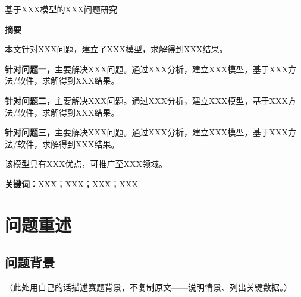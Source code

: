 \documentclass[12pt,a4paper]{article}
\title{}
\author{}\date{}
\numberwithin{equation}{section}
\numberwithin{figure}{section}
\numberwithin{table}{section}
\begin{document}
\thispagestyle{empty}


\vspace{0.5cm}

\begin{center}
\heiti{}
基于XXX模型的XXX问题研究
\end{center}


\begin{center}
\heiti{}\textbf{摘要}
\end{center}

\vspace{0.2cm}

本文针对XXX问题，建立了XXX模型，求解得到XXX结果。

\textbf{针对问题一，}主要解决XXX问题。通过XXX分析，建立XXX模型，基于XXX方法/软件，求解得到XXX结果。

\textbf{针对问题二，}主要解决XXX问题。通过XXX分析，建立XXX模型，基于XXX方法/软件，求解得到XXX结果。

\textbf{针对问题三，}主要解决XXX问题。通过XXX分析，建立XXX模型，基于XXX方法/软件，求解得到XXX结果。

该模型具有XXX优点，可推广至XXX领域。

\vspace{0.5cm}

\noindent\textbf{关键词：}XXX；XXX；XXX；XXX

\newpage


\setcounter{page}{1}
\pagestyle{fancy}

\section{问题重述}
\subsection{问题背景}
（此处用自己的话描述赛题背景，不复制原文——说明情景、列出关键数据。）
\end{document}
